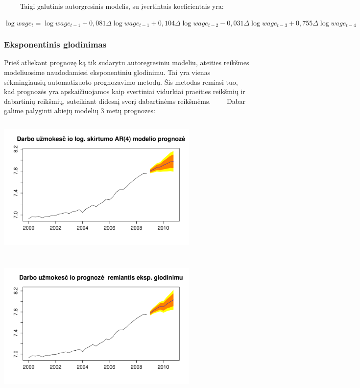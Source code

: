 \documentclass[12pt,a4paper]{article}
\theoremstyle{change}\newtheorem{salyga}{Uždavinys}
\begin{document}
$\qquad$ Taigi galutinis autorgresinis modelis, su įvertintais koeficientais yra:
\begin{center}
  \large$ \log wage_t=\log wage_{t-1}+0,081\Delta\log wage_{t-1}+0,104\Delta\log wage_{t-2}-0,031\Delta\log wage_{t-3}+0,755\Delta\log wage_{t-4} $ 
\end{center}  
     
     
     
     
     
     
\subsubsection{Eksponentinis glodinimas} 
\hspace{40pt}Prieš atliekant prognozę ką tik sudarytu autoregresiniu modeliu, ateities reikšmes modeliuosime naudodamiesi eksponentiniu glodinimu. Tai yra vienas sėkmingiausių automatizuoto prognozavimo metodų. Šis metodas remiasi tuo, kad prognozės yra apskaičiuojamos kaip svertiniai vidurkiai praeities reikšmių ir dabartinių reikšmių, suteikiant didesnį svorį dabartinėms reikšmėms. 
\vskip 8pt  
$\qquad$Dabar galime palyginti abiejų modelių 3 metų prognozes: 

\begin{center}
\includegraphics[width=100mm,height=70mm]{farlwage7}
\end{center}

\begin{center}
\includegraphics[width=100mm,height=70mm]{fexp}
\end{center}     
\end{document}
